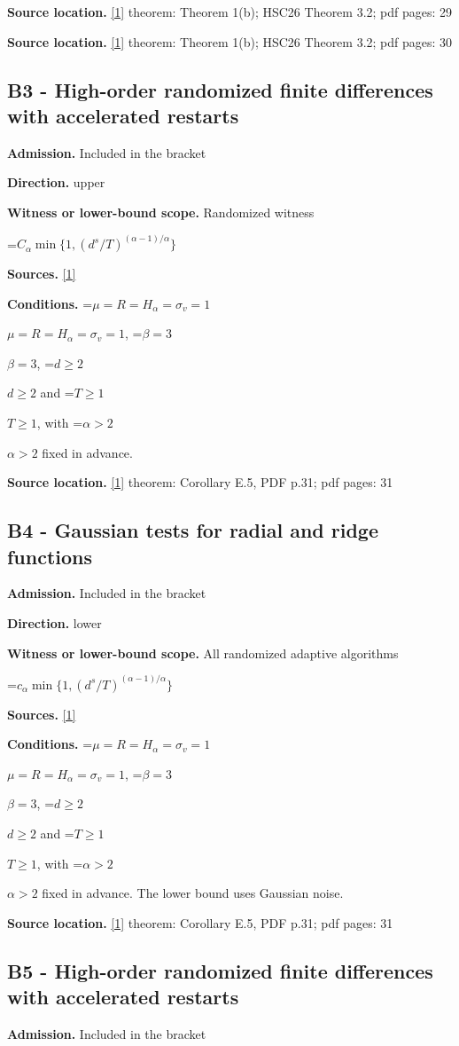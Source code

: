 \documentclass[10pt,a4paper]{article}
\newcommand{\AtlasMath}[1]{\par\begingroup\centering\setbox0=\hbox{$\displaystyle #1$}\ifdim\wd0>1.4\linewidth\typeout{ATLAS WIDE FORMULA: \the\wd0}\fi\ifdim\wd0>\linewidth\resizebox{\linewidth}{!}{\box0}\else\box0\fi\par\endgroup}
\newcommand{\AtlasInlineMath}[1]{\begingroup\setbox0=\hbox{$#1$}\ifdim\wd0>.4\linewidth\endgroup\AtlasMath{#1}\else\endgroup$#1$\fi}
\begin{document}
\textbf{Source location.} \href{https://arxiv.org/pdf/2610.05517v2}{[1]} theorem: Theorem 1(b); HSC26 Theorem 3.2; pdf pages: 29

\textbf{Source location.} \href{https://arxiv.org/pdf/2610.05517v2}{[1]} theorem: Theorem 1(b); HSC26 Theorem 3.2; pdf pages: 30

\subsection{B3 - High-order randomized finite differences with accelerated restarts}
\textbf{Admission.} Included in the bracket

\textbf{Direction.} upper

\textbf{Witness or lower-bound scope.} Randomized witness

\AtlasMath{C_\alpha\min\{1,(d^s/T)^{(\alpha-1)/\alpha}\}}
\textbf{Sources.} \href{https://arxiv.org/pdf/2610.05517v2}{[1]}

\textbf{Conditions.} \AtlasInlineMath{\mu=R=H_\alpha=\sigma_v=1}, \AtlasInlineMath{\beta=3}, \AtlasInlineMath{d\ge2} and \AtlasInlineMath{T\ge1}, with \AtlasInlineMath{\alpha>2} fixed in advance.

\textbf{Source location.} \href{https://arxiv.org/pdf/2610.05517v2}{[1]} theorem: Corollary E.5, PDF p.31; pdf pages: 31

\subsection{B4 - Gaussian tests for radial and ridge functions}
\textbf{Admission.} Included in the bracket

\textbf{Direction.} lower

\textbf{Witness or lower-bound scope.} All randomized adaptive algorithms

\AtlasMath{c_\alpha\min\{1,(d^s/T)^{(\alpha-1)/\alpha}\}}
\textbf{Sources.} \href{https://arxiv.org/pdf/2610.05517v2}{[1]}

\textbf{Conditions.} \AtlasInlineMath{\mu=R=H_\alpha=\sigma_v=1}, \AtlasInlineMath{\beta=3}, \AtlasInlineMath{d\ge2} and \AtlasInlineMath{T\ge1}, with \AtlasInlineMath{\alpha>2} fixed in advance. The lower bound uses Gaussian noise.

\textbf{Source location.} \href{https://arxiv.org/pdf/2610.05517v2}{[1]} theorem: Corollary E.5, PDF p.31; pdf pages: 31

\subsection{B5 - High-order randomized finite differences with accelerated restarts}
\textbf{Admission.} Included in the bracket
\end{document}
